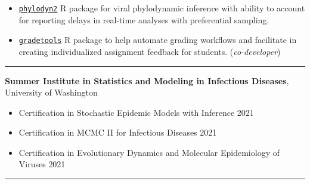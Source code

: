 \documentclass{article}
\begin{document}
	
	\begin{description}
		\vspace{-2mm}
		\item[Software Developed]\hspace*{.1in}
		
		\begin{itemize}
			\item \href{https://github.com/CatalinaMedina/phylodyn2}{\texttt{phylodyn2}} R package for viral phylodynamic inference with ability to account for reporting delays in real-time analyses with preferential sampling.
			
			\item \href{https://federicazoe.github.io/gradetools/}{\texttt{gradetools}} R package to help automate grading workflows and facilitate in creating individualized assignment feedback for students. (\textit{co-developer})
		\end{itemize}
	\end{description}
	\vspace{-2mm}
	\rule{\linewidth}{1pt}
	
	
	\begin{description}
		\vspace{-2mm}
		\item[Certifications]\hspace*{.01in}
		
		\textbf{Summer Institute in Statistics and Modeling in Infectious Diseases}, University of Washington
		
		\begin{itemize}
			\item Certification in Stochastic Epidemic Models with Inference  \hfill{2021}
			\item Certification in MCMC II for Infectious Diseases \hfill{2021}
			\item Certification in Evolutionary Dynamics and Molecular Epidemiology of Viruses \hfill{2021}
		\end{itemize}
	\end{description}
	\vspace{-2mm}
	\rule{\linewidth}{1pt}
	
	
	
\end{document}
